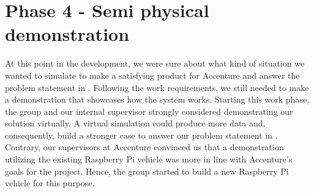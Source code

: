 \section{Phase 4 - Semi physical demonstration}
At this point in the development, we were sure about what kind of situation we wanted to simulate to make a satisfying product for Accenture and answer the problem statement in . Following the work requirements, we still needed to make a demonstration that showcases how the system works. Starting this work phase, the group and our internal supervisor strongly considered demonstrating our solution virtually. A virtual simulation could produce more data and, consequently, build a stronger case to answer our problem statement in . Contrary, our supervisors at Accenture convinced us that a demonstration utilizing the existing Raspberry Pi vehicle was more in line with Accenture's goals for the project. Hence, the group started to build a new Raspberry Pi vehicle for this purpose.




\clearpage
%
%

